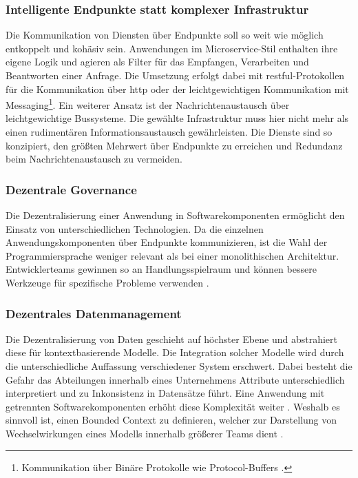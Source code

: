 \subsubsection{Intelligente Endpunkte statt komplexer Infrastruktur}
Die Kommunikation von Diensten über Endpunkte soll so weit wie möglich entkoppelt und kohäsiv sein.  
Anwendungen im Microservice-Stil enthalten ihre eigene Logik und agieren als Filter für das Empfangen, Verarbeiten und Beantworten einer Anfrage. 
Die Umsetzung erfolgt dabei mit \acs{rest}ful-Protokollen für die Kommunikation über \acs{http} oder der leichtgewichtigen Kommunikation mit Messaging\footnote{Kommunikation über Binäre Protokolle wie Protocol-Buffers \cite{ProtoBuf}.}.
Ein weiterer Ansatz ist der Nachrichtenaustausch über leichtgewichtige Bussysteme.
Die gewählte Infrastruktur muss hier nicht mehr als einen rudimentären Informationsaustausch gewährleisten. 
Die Dienste sind so konzipiert, den größten Mehrwert über Endpunkte zu erreichen und Redundanz beim Nachrichtenaustausch zu vermeiden.

\subsubsection{Dezentrale Governance}
Die Dezentralisierung einer Anwendung in Softwarekomponenten ermöglicht den Einsatz von unterschiedlichen Technologien. 
Da die einzelnen Anwendungskomponenten über Endpunkte kommunizieren, ist die Wahl der Programmiersprache weniger relevant als bei einer monolithischen Architektur. 
Entwicklerteams gewinnen so an Handlungsspielraum und können bessere Werkzeuge für spezifische Probleme verwenden \cite{FowlerMicroservice}.

\subsubsection{Dezentrales Datenmanagement}
Die Dezentralisierung von Daten geschieht auf höchster Ebene und abstrahiert diese für kontextbasierende Modelle. 
Die Integration solcher Modelle wird durch die unterschiedliche Auffassung verschiedener System erschwert. 
Dabei besteht die Gefahr das Abteilungen innerhalb eines Unternehmens Attribute unterschiedlich interpretiert und zu Inkonsistenz in Datensätze führt.
Eine Anwendung mit getrennten Softwarekomponenten erhöht diese Komplexität weiter \cite{FowlerMicroservice}. 
Weshalb es sinnvoll ist, einen \glqq Bounded Context\grqq{} zu definieren, welcher zur Darstellung von Wechselwirkungen eines Modells innerhalb größerer Teams dient \cite{FowlerBoundedContext}. 

